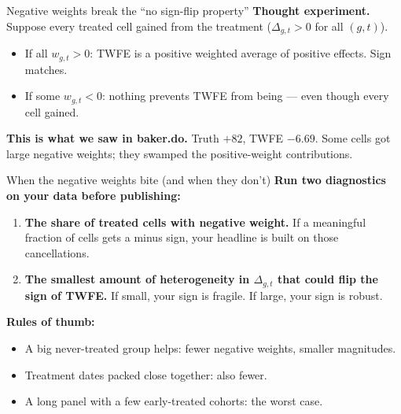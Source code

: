 \documentclass[aspectratio=169,11pt]{beamer}
\begin{document}
\begin{frame}{Negative weights break the ``no sign-flip property''}
\vspace{0.5em}
\textbf{Thought experiment.} \;Suppose every treated cell gained from the treatment ($\Delta_{g,t} > 0$ for all $(g,t)$).
\vspace{0.4em}
\begin{itemize}\small
  \item If all $w_{g,t} > 0$: TWFE is a positive weighted average of positive effects. \;Sign matches.
  \item If some $w_{g,t} < 0$: nothing prevents TWFE from being  --- even though every cell gained.
\end{itemize}
\vspace{0.6em}
\textbf{This is what we saw in baker.do.} \;Truth $+82$, TWFE $-6.69$. Some cells got large negative weights; they swamped the positive-weight contributions.
\vspace{0.5em}
\end{frame}

\begin{frame}{When the negative weights bite (and when they don't)}
\vspace{0.4em}
\textbf{Run two diagnostics on your data before publishing:}
\vspace{0.4em}
\begin{enumerate}\small
  \item \textbf{The share of treated cells with negative weight.} \;If a meaningful fraction of cells gets a minus sign, your headline is built on those cancellations.
  \item \textbf{The smallest amount of heterogeneity in $\Delta_{g,t}$ that could flip the sign of TWFE.} \;If small, your sign is fragile. If large, your sign is robust.
\end{enumerate}
\vspace{0.5em}
\textbf{Rules of thumb:}
\begin{itemize}\small
  \item A big never-treated group helps: fewer negative weights, smaller magnitudes.
  \item Treatment dates packed close together: also fewer.
  \item A long panel with a few early-treated cohorts: the worst case.
\end{itemize}
\vspace{0.4em}
\end{frame}
\end{document}

